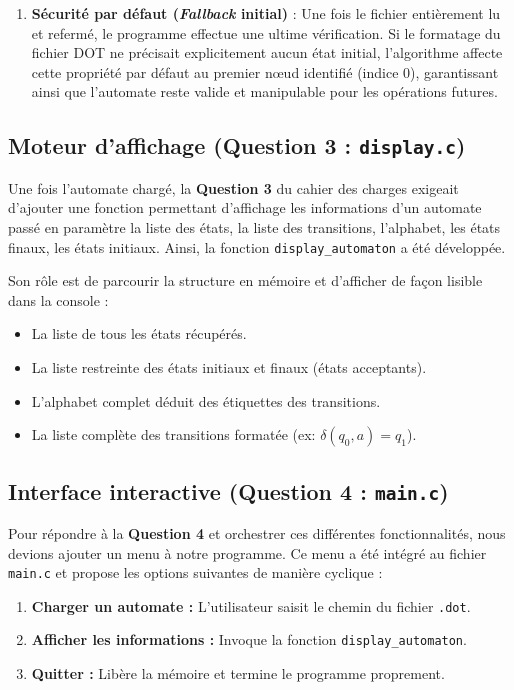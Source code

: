 \documentclass[12pt,a4paper]{article}
\begin{document}
\begin{enumerate}
    \item \textbf{Sécurité par défaut (\textit{Fallback} initial)} : Une fois le fichier entièrement lu et refermé, le programme effectue une ultime vérification. Si le formatage du fichier DOT ne précisait explicitement aucun état initial, l'algorithme affecte cette propriété par défaut au premier nœud identifié (indice 0), garantissant ainsi que l'automate reste valide et manipulable pour les opérations futures.
\end{enumerate}




\subsection{Moteur d'affichage (Question 3 : \texttt{display.c})}
Une fois l'automate chargé, la \textbf{Question 3} du cahier des charges exigeait d'ajouter une fonction permettant d'affichage les informations d'un automate passé en paramètre la liste des états, la liste des transitions, l'alphabet, les états finaux, les états initiaux. Ainsi, la fonction \texttt{display\_automaton} a été développée.

Son rôle est de parcourir la structure en mémoire et d'afficher de façon lisible dans la console :
\begin{itemize}
\item La liste de tous les états récupérés.
\item La liste restreinte des états initiaux et finaux (états acceptants).
\item L'alphabet complet déduit des étiquettes des transitions.
\item La liste complète des transitions formatée (ex: $\delta(q_0, a) = q_1$).
\end{itemize}

\subsection{Interface interactive (Question 4 : \texttt{main.c})}
Pour répondre à la \textbf{Question 4} et orchestrer ces différentes fonctionnalités, nous devions ajouter un menu à notre programme. Ce menu a été intégré au fichier \texttt{main.c} et propose les options suivantes de manière cyclique :
\begin{enumerate}
\item \textbf{Charger un automate :} L'utilisateur saisit le chemin du fichier \texttt{.dot}.
\item \textbf{Afficher les informations :} Invoque la fonction \texttt{display\_automaton}.
\item \textbf{Quitter :} Libère la mémoire et termine le programme proprement.
\end{enumerate}
\end{document}
